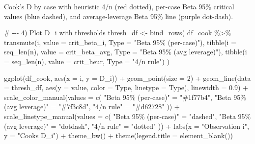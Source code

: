 \documentclass[
  letterpaper,
  DIV=11,
  numbers=noendperiod]{scrreprt}
\newenvironment{Shaded}{\begin{snugshade}}{\end{snugshade}}
\newcommand{\AttributeTok}[1]{\textcolor[rgb]{0.40,0.45,0.13}{#1}}
\newcommand{\CommentTok}[1]{\textcolor[rgb]{0.37,0.37,0.37}{#1}}
\newcommand{\DecValTok}[1]{\textcolor[rgb]{0.68,0.00,0.00}{#1}}
\newcommand{\FloatTok}[1]{\textcolor[rgb]{0.68,0.00,0.00}{#1}}
\newcommand{\FunctionTok}[1]{\textcolor[rgb]{0.28,0.35,0.67}{#1}}
\newcommand{\NormalTok}[1]{\textcolor[rgb]{0.00,0.23,0.31}{#1}}
\newcommand{\OtherTok}[1]{\textcolor[rgb]{0.00,0.23,0.31}{#1}}
\newcommand{\SpecialCharTok}[1]{\textcolor[rgb]{0.37,0.37,0.37}{#1}}
\newcommand{\StringTok}[1]{\textcolor[rgb]{0.13,0.47,0.30}{#1}}
\begin{document}
Cook's D by case with heuristic 4/n (red dotted), per-case Beta 95\%
critical values (blue dashed), and average-leverage Beta 95\% line
(purple dot-dash).

\begin{Shaded}
\begin{Highlighting}[]
\CommentTok{\# {-}{-}{-} 4) Plot D\_i with thresholds}
\NormalTok{thresh\_df }\OtherTok{\textless{}{-}} \FunctionTok{bind\_rows}\NormalTok{(}
\NormalTok{  df\_cook }\SpecialCharTok{\%\textgreater{}\%} \FunctionTok{transmute}\NormalTok{(i, }\AttributeTok{value =}\NormalTok{ crit\_beta\_i,   }\AttributeTok{Type =} \StringTok{"Beta 95\% (per{-}case)"}\NormalTok{),}
  \FunctionTok{tibble}\NormalTok{(}\AttributeTok{i =} \FunctionTok{seq\_len}\NormalTok{(n), }\AttributeTok{value =}\NormalTok{ crit\_beta\_avg,   }\AttributeTok{Type =} \StringTok{"Beta 95\% (avg leverage)"}\NormalTok{),}
  \FunctionTok{tibble}\NormalTok{(}\AttributeTok{i =} \FunctionTok{seq\_len}\NormalTok{(n), }\AttributeTok{value =}\NormalTok{ crit\_heur,       }\AttributeTok{Type =} \StringTok{"4/n rule"}\NormalTok{)}
\NormalTok{)}

\FunctionTok{ggplot}\NormalTok{(df\_cook, }\FunctionTok{aes}\NormalTok{(}\AttributeTok{x =}\NormalTok{ i, }\AttributeTok{y =}\NormalTok{ D\_i)) }\SpecialCharTok{+}
  \FunctionTok{geom\_point}\NormalTok{(}\AttributeTok{size =} \DecValTok{2}\NormalTok{) }\SpecialCharTok{+}
  \FunctionTok{geom\_line}\NormalTok{(}\AttributeTok{data =}\NormalTok{ thresh\_df,}
            \FunctionTok{aes}\NormalTok{(}\AttributeTok{y =}\NormalTok{ value, }\AttributeTok{color =}\NormalTok{ Type, }\AttributeTok{linetype =}\NormalTok{ Type),}
            \AttributeTok{linewidth =} \FloatTok{0.9}\NormalTok{) }\SpecialCharTok{+}
  \FunctionTok{scale\_color\_manual}\NormalTok{(}\AttributeTok{values =} \FunctionTok{c}\NormalTok{(}
    \StringTok{"Beta 95\% (per{-}case)"}      \OtherTok{=} \StringTok{"\#1f77b4"}\NormalTok{,}
    \StringTok{"Beta 95\% (avg leverage)"}  \OtherTok{=} \StringTok{"\#7f3c8d"}\NormalTok{,}
    \StringTok{"4/n rule"}                 \OtherTok{=} \StringTok{"\#d62728"}
\NormalTok{  )) }\SpecialCharTok{+}
  \FunctionTok{scale\_linetype\_manual}\NormalTok{(}\AttributeTok{values =} \FunctionTok{c}\NormalTok{(}
    \StringTok{"Beta 95\% (per{-}case)"}      \OtherTok{=} \StringTok{"dashed"}\NormalTok{,}
    \StringTok{"Beta 95\% (avg leverage)"}  \OtherTok{=} \StringTok{"dotdash"}\NormalTok{,}
    \StringTok{"4/n rule"}                 \OtherTok{=} \StringTok{"dotted"}
\NormalTok{  )) }\SpecialCharTok{+}
  \FunctionTok{labs}\NormalTok{(}\AttributeTok{x =} \StringTok{"Observation i"}\NormalTok{, }\AttributeTok{y =} \StringTok{"Cook\textquotesingle{}s D\_i"}\NormalTok{) }\SpecialCharTok{+}
  \FunctionTok{theme\_bw}\NormalTok{() }\SpecialCharTok{+}
  \FunctionTok{theme}\NormalTok{(}\AttributeTok{legend.title =} \FunctionTok{element\_blank}\NormalTok{())}
\end{Highlighting}
\end{Shaded}
\end{document}
